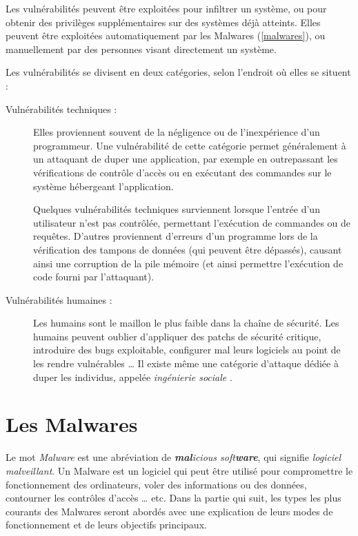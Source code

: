     Les vulnérabilités peuvent être exploitées pour infiltrer un système, ou pour obtenir des privilèges supplémentaires
    sur des systèmes déjà atteints. Elles peuvent être exploitées automatiquement par les Malwares 
    (\autoref{malwares}), ou manuellement par des personnes visant directement un système. %

    Les vulnérabilités se divisent en deux catégories, selon l'endroit où elles se situent : %
    
    \begin{description}
        \item[Vulnérabilités techniques :] Elles proviennent souvent de la négligence ou de l'inexpérience d'un 
            programmeur. Une vulnérabilité de cette catégorie permet généralement à un attaquant de duper 
            une application, par exemple en outrepassant les vérifications de contrôle d'accès ou en exécutant
            des commandes sur le système hébergeant l'application.
            \label{buffer_overflow} %

            Quelques vulnérabilités techniques surviennent lorsque l'entrée d'un utilisateur n'est pas contrôlée,
            permettant l'exécution de commandes ou de requêtes. D'autres proviennent d'erreurs d'un programme
            lors de la vérification des tampons de données (qui peuvent être dépassés), 
            causant ainsi une corruption de la pile mémoire
            (et ainsi permettre l'exécution de code fourni par l'attaquant). \cite{vulnerabilites} %

        \item[Vulnérabilités humaines :] Les humains sont le maillon le plus faible dans la chaîne de sécurité.
            Les humains peuvent oublier d'appliquer des patchs de sécurité critique, introduire des bugs
            exploitable, configurer mal leurs logiciels au point de les rendre vulnérables \ldots{}
            Il existe même une catégorie d'attaque dédiée à duper les individus, appelée \emph{ingénierie sociale} 
            \cite{bases_hacking}. %
    \end{description}

\section{Les Malwares} \label{malwares}
    Le mot \emph{Malware} est une abréviation de \emph{\textbf{mal}icious soft\textbf{ware}}, qui signifie 
    \emph{logiciel malveillant}. Un Malware est un logiciel qui peut être utilisé pour compromettre le
    fonctionnement des ordinateurs, voler des informations ou des données, contourner les contrôles d'accès
    \ldots{} etc. Dans la partie qui suit, les types les plus courants des Malwares seront abordés avec une explication 
    de leurs modes de fonctionnement et de leurs objectifs principaux. \cite{malware_types}%


